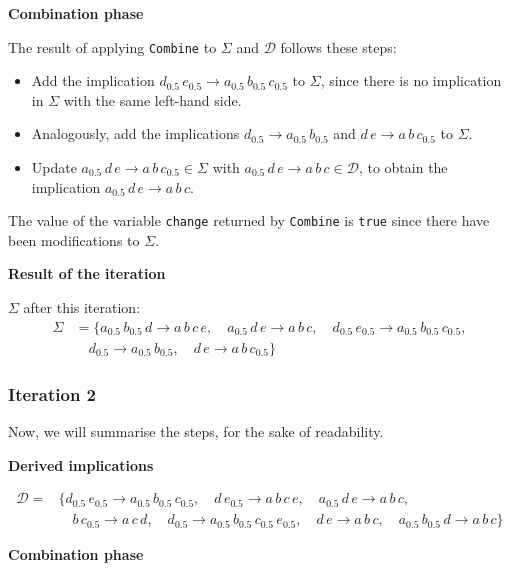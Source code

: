 \documentclass[
  letterpaper,
  DIV=11,
  numbers=noendperiod]{scrartcl}
\providecommand{\tightlist}{%
  \setlength{\itemsep}{0pt}\setlength{\parskip}{0pt}}\usepackage{longtable,booktabs,array}
\begin{document}
\textbf{Combination phase}

The result of applying \texttt{Combine} to \(\Sigma\) and \(\mathcal D\)
follows these steps:

\begin{itemize}
\tightlist
\item
  Add the implication \(d_{0.5}\,e_{0.5} \to a_{0.5}\,b_{0.5}\,c_{0.5}\)
  to \(\Sigma\), since there is no implication in \(\Sigma\) with the
  same left-hand side.
\item
  Analogously, add the implications \(d_{0.5} \to a_{0.5}\,b_{0.5}\) and
  \(d\,e \to a\,b\,c_{0.5}\) to \(\Sigma\).
\item
  Update \(a_{0.5}\,d\,e \to a\,b\,c_{0.5} \in \Sigma\) with
  \(a_{0.5}\,d\,e \to a\,b\,c\in\mathcal D\), to obtain the implication
  \(a_{0.5}\,d\,e \to a\,b\,c\).
\end{itemize}

The value of the variable \texttt{change} returned by \texttt{Combine}
is \texttt{true} since there have been modifications to \(\Sigma\).

\textbf{Result of the iteration}

\(\Sigma\) after this iteration: \begin{align*}
\Sigma & = \big\{a_{0.5}\,b_{0.5}\,d \to a\,b\,c\,e,\quad a_{0.5}\,d\,e \to a\,b\,c,\quad d_{0.5}\,e_{0.5} \to a_{0.5}\,b_{0.5}\,c_{0.5},\\
& \quad d_{0.5} \to a_{0.5}\,b_{0.5},\quad d\,e \to a\,b\,c_{0.5}\big\}
\end{align*}

\subsubsection{Iteration 2}\label{iteration-2}

Now, we will summarise the steps, for the sake of readability.

\textbf{Derived implications}

\begin{align*}
\mathcal D = & \big\{d_{0.5}\,e_{0.5} \to a_{0.5}\,b_{0.5}\,c_{0.5},\quad d\,e_{0.5} \to a\,b\,c\,e,\quad a_{0.5}\,d\,e \to a\,b\,c, \\
& \quad b\,c_{0.5} \to a\,c\,d,\quad d_{0.5} \to a_{0.5}\,b_{0.5}\,c_{0.5}\,e_{0.5},\quad d\,e \to a\,b\,c, \quad a_{0.5}\,b_{0.5}\,d \to a\,b\,c\big\}
\end{align*}

\textbf{Combination phase}
\end{document}
